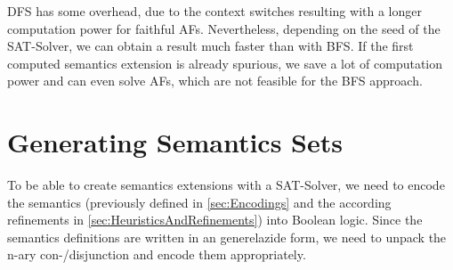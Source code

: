 DFS has some overhead, due to the context switches resulting with a longer computation power for faithful AFs. Nevertheless, depending on the seed of the SAT-Solver, we can obtain a result much faster than with BFS. If the first computed semantics extension is already spurious, we save a lot of computation power and can even solve AFs, which are not feasible for the BFS approach.







\section{Generating Semantics Sets}
\label{sec:ImplementationsGeneratingSemanticsSets}

To be able to create semantics extensions with a SAT-Solver, we need to encode the semantics (previously defined in \cref{sec:Encodings} and the according refinements in \cref{sec:HeuristicsAndRefinements}) into Boolean logic. Since the semantics definitions are written in an generelazide form, we need to unpack the n-ary con-/disjunction and encode them appropriately.


